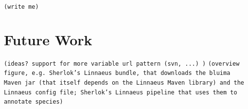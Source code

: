 \documentclass{article}
\newcommand{\TODO}[1]{\texttt{\textcolor{YellowOrange}{(#1)}}} %
\begin{document}
\TODO{write me}

\section{Future Work}

\TODO{ideas? support for more variable url pattern (svn, ...) }
\TODO{overview figure, e.g.  Sherlok's Linnaeus bundle, that downloads the bluima Maven jar (that itself depends on the Linnaeus Maven library) and the Linnaeus config file; Sherlok's Linnaeus pipeline that uses them to annotate species}


\end{document}
